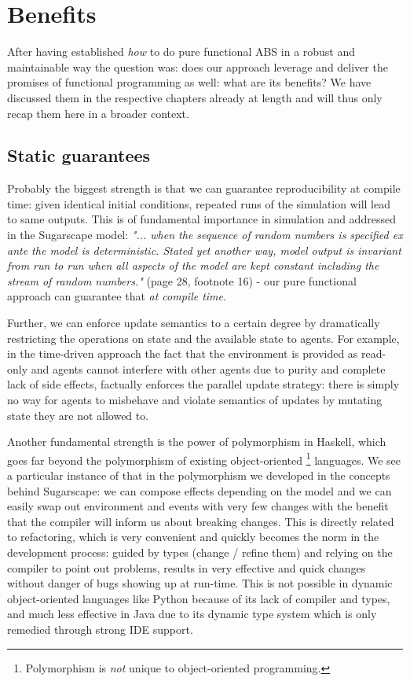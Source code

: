 \section{Benefits}
After having established \textit{how} to do pure functional ABS in a robust and maintainable way the question was: does our approach leverage and deliver the promises of functional programming as well: what are its benefits? We have discussed them in the respective chapters already at length and will thus only recap them here in a broader context.

\subsection{Static guarantees}
Probably the biggest strength is that we can guarantee reproducibility at compile time: given identical initial conditions, repeated runs of the simulation will lead to same outputs. This is of fundamental importance in simulation and addressed in the Sugarscape model: \textit{"... when the sequence of random numbers is specified ex ante the model is deterministic. Stated yet another way, model output is invariant from run to run when all aspects of the model are kept constant including the stream of random numbers."} (page 28, footnote 16) - our pure functional approach can guarantee that \textit{at compile time}.

Further, we can enforce update semantics to a certain degree by dramatically restricting the operations on state and the available state to agents. For example, in the time-driven approach the fact that the environment is provided as read-only and agents cannot interfere with other agents due to purity and complete lack of side effects, factually enforces the parallel update strategy: there is simply no way for agents to misbehave and violate semantics of updates by mutating state they are not allowed to.

Another fundamental strength is the power of polymorphism in Haskell, which goes far beyond the polymorphism of existing object-oriented \footnote{Polymorphism is \textit{not} unique to object-oriented programming.} languages. We see a particular instance of that in the polymorphism we developed in the concepts behind Sugarscape: we can compose effects depending on the model and we can easily swap out environment and events with very few changes with the benefit that the compiler will inform us about breaking changes. This is directly related to refactoring, which is very convenient and quickly becomes the norm in the development process: guided by types (change / refine them) and relying on the compiler to point out problems, results in very effective and quick changes without danger of bugs showing up at run-time. This is not possible in dynamic object-oriented languages like Python because of its lack of compiler and types, and much less effective in Java due to its dynamic type system which is only remedied through strong IDE support.

